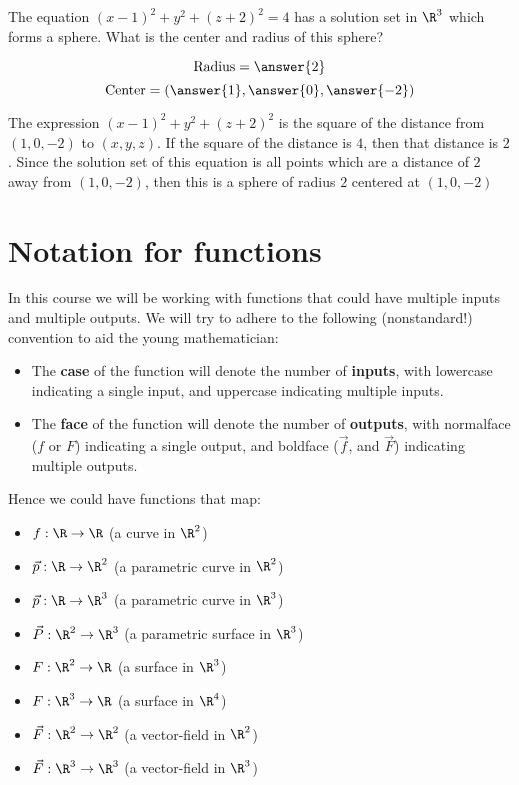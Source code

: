 \documentclass{ximera}
\begin{document}
\begin{question}
  The equation $(x-1)^2+y^2+(z+2)^2 = 4$ has a solution set in
  $\R^3$ which forms a sphere.  What is the center and
  radius of this sphere?
  \begin{prompt}
  \[
  \text{Radius} = \answer{2}
  \]
  \[
  \text{Center} = \left(\answer{1},\answer{0}, \answer{-2} \right)
  \]
  \end{prompt}
  \begin{hint}
    The expression $(x-1)^2+y^2+(z+2)^2$ is the square of the distance
    from $(1,0,-2)$ to $(x,y,z)$.  If the square of the distance is
    $4$, then that distance is $2$.  Since the solution set of this
    equation is all points which are a distance of $2$ away from
    $(1,0,-2)$, then this is a sphere of radius $2$ centered at
    $(1,0,-2)$
  \end{hint}
\end{question}


\section{Notation for functions}

In this course we will be working with functions that could have multiple
inputs and multiple outputs. We will try to adhere to the following
(nonstandard!) convention to aid the young mathematician:

\begin{itemize}
  \item The \textbf{case} of the function will denote the number of
    \textbf{inputs}, with lowercase indicating a single input, and uppercase
    indicating multiple inputs.
  \item The \textbf{face} of the function will denote the number of
    \textbf{outputs}, with normalface ($f$ or $F$) indicating a single
    output, and boldface ($\vec{f}$, and $\vec{F}$) indicating multiple
    outputs.
\end{itemize}
Hence we could have functions that map:
\begin{itemize}
\item $f:\R \to \R$ (a curve in $\R^2$)
\item $\vec{p}:\R \to \R^2$ (a parametric curve in $\R^2$)
\item $\vec{p}:\R \to \R^3$ (a parametric curve in $\R^3$)
\item $\vec{P}:\R^2 \to \R^3$ (a parametric surface in $\R^3$)
\item $F:\R^2\to \R$ (a surface in $\R^3$)
\item $F:\R^3\to \R$ (a surface in $\R^4$)
\item $\vec{F}:\R^2 \to \R^2$ (a vector-field in $\R^2$)
\item $\vec{F}:\R^3 \to \R^3$ (a vector-field in $\R^3$)
\end{itemize}
\end{document}
